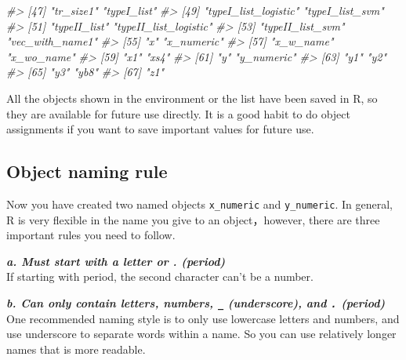 \documentclass[
]{book}
\newenvironment{Shaded}{\begin{snugshade}}{\end{snugshade}}
\newcommand{\CommentTok}[1]{\textcolor[rgb]{0.56,0.35,0.01}{\textit{#1}}}
\begin{document}
\begin{Shaded}
\begin{Highlighting}[]
\CommentTok{\#\textgreater{} [47] "tr\_size1"                           "typeI\_list"                        }
\CommentTok{\#\textgreater{} [49] "typeI\_list\_logistic"                "typeI\_list\_svm"                    }
\CommentTok{\#\textgreater{} [51] "typeII\_list"                        "typeII\_list\_logistic"              }
\CommentTok{\#\textgreater{} [53] "typeII\_list\_svm"                    "vec\_with\_name1"                    }
\CommentTok{\#\textgreater{} [55] "x"                                  "x\_numeric"                         }
\CommentTok{\#\textgreater{} [57] "x\_w\_name"                           "x\_wo\_name"                         }
\CommentTok{\#\textgreater{} [59] "x1"                                 "xs4"                               }
\CommentTok{\#\textgreater{} [61] "y"                                  "y\_numeric"                         }
\CommentTok{\#\textgreater{} [63] "y1"                                 "y2"                                }
\CommentTok{\#\textgreater{} [65] "y3"                                 "yb8"                               }
\CommentTok{\#\textgreater{} [67] "z1"}
\end{Highlighting}
\end{Shaded}

All the objects shown in the environment or the list have been saved in R, so they are available for future use directly. It is a good habit to do object assignments if you want to save important values for future use.

\hypertarget{Naming}{%
\subsection{Object naming rule}\label{Naming}}

Now you have created two named objects \texttt{x\_numeric} and \texttt{y\_numeric}. In general, R is very flexible in the name you give to an object，however, there are three important rules you need to follow.

\textbf{\emph{a. Must start with a letter or . (period)}}\\
If starting with period, the second character can't be a number.

\textbf{\emph{b. Can only contain letters, numbers, \texttt{\_} (underscore), and \texttt{.} (period)}}
One recommended naming style is to only use lowercase letters and numbers, and use underscore to separate words within a name. So you can use relatively longer names that is more readable.
\end{document}
